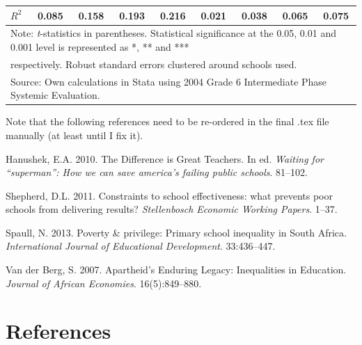 \documentclass[12pt,preprint, authoryear]{article}
\numberwithin{equation}{section}
\numberwithin{figure}{section}
\numberwithin{table}{section}
\begin{document}
\begin{longtable}[htbp] {p{5cm}*{4}{c}|*{4}{c}}
\(R^{2}\)       &    0.085         &    0.158         &    0.193         &    0.216         &    0.021         &    0.038         &    0.065         &    0.075         \\
\hline\hline
\multicolumn{9}{l}{Note: \textit{t}-statistics in parentheses. Statistical significance at the 0.05, 0.01 and 0.001 level is represented as *, ** and ***} \\
\multicolumn{9}{l}{ respectively. Robust standard errors clustered around schools used.}\\
\multicolumn{9}{l}{Source: Own calculations in Stata using 2004 Grade 6 Intermediate Phase Systemic Evaluation.}\\
\end{longtable}

\normalsize

\newpage

Note that the following references need to be re-ordered in the final
.tex file manually (at least until I fix it).

\hypertarget{refs}{}
\hypertarget{ref-Hanushek2010}{}
Hanushek, E.A. 2010. The Difference is Great Teachers. In ed.
\emph{Waiting for ``superman'': How we can save america's failing public
schools}. 81--102.

\hypertarget{ref-Shepherd2011}{}
Shepherd, D.L. 2011. Constraints to school effectiveness: what prevents
poor schools from delivering results? \emph{Stellenbosch Economic
Working Papers}. 1--37.

\hypertarget{ref-Spaull2013}{}
Spaull, N. 2013. Poverty \& privilege: Primary school inequality in
South Africa. \emph{International Journal of Educational Development}.
33:436--447.

\hypertarget{ref-vanderBerg2007}{}
Van der Berg, S. 2007. Apartheid's Enduring Legacy: Inequalities in
Education. \emph{Journal of African Economies}. 16(5):849--880.

\newcommand\wordcount{
    \immediate\write18{texcount -sub=section \jobname.tex  | grep "Section" |     sed -e 's/+.*//' | sed -n \thesection p > 'count.txt'}
(words)}

\section*{References}
\end{document}
